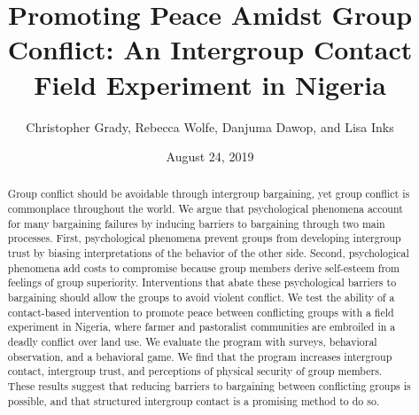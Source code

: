\documentclass[11pt]{article}
\title{Promoting Peace Amidst Group Conflict: An Intergroup Contact Field
Experiment in Nigeria}
\author{
Christopher Grady, Rebecca Wolfe, Danjuma Dawop, and Lisa Inks
}
\date{August 24, 2019}
\begin{document}
\VerbatimFootnotes

%
%
%
%
%
%
%
%
%
%

\maketitle

\begin{abstract}

Group conflict should be avoidable through intergroup bargaining, yet group conflict is commonplace throughout the world.  We argue that psychological phenomena account for many bargaining failures by inducing barriers to bargaining through two main processes.  First, psychological phenomena prevent groups from developing intergroup trust by biasing interpretations of the behavior of the other side.  Second, psychological phenomena add costs to compromise because group members derive self-esteem from feelings of group superiority.  Interventions that abate these psychological barriers to bargaining should allow the groups to avoid violent conflict.  We test the ability of a contact-based intervention to promote peace between conflicting groups with a field experiment in Nigeria, where farmer and pastoralist communities are embroiled in a deadly conflict over land use.  We evaluate the program with surveys, behavioral observation, and a behavioral game.  We find that the program increases intergroup contact, intergroup trust, and perceptions of physical security of group members.  These results suggest that reducing barriers to bargaining between conflicting groups is possible, and that structured intergroup contact is a promising method to do so.


\end{abstract}
\end{document}
